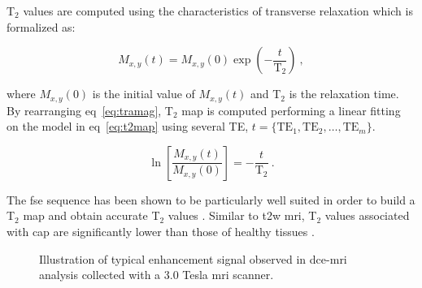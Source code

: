 T$_2$ values are computed using the characteristics of transverse relaxation which is formalized as:

\begin{equation}
	M_{x,y}(t) = M_{x,y}(0) \exp \left( - \frac{t}{\text{T}_2} \right) \ ,
	\label{eq:tramag}
\end{equation}

\noindent where $M_{x,y}(0)$ is the initial value of $M_{x,y}(t)$ and T$_2$ is the relaxation time.
By rearranging \acs{eq}~\ref{eq:tramag}, T$_2$ map is computed performing a linear fitting on the model in \acs{eq}~\ref{eq:t2map} using several TE, $t=\{ \text{TE}_1,\text{TE}_2, \dotsc ,\text{TE}_m \}$.

\begin{equation}
	\ln \left[ \frac{M_{x,y}(t)}{M_{x,y}(0)} \right] = - \frac{t}{\text{T}_2} \ .
	\label{eq:t2map}
\end{equation}

The \Ac{fse} sequence has been shown to be particularly well suited in order to build a T$_2$ map and obtain accurate T$_2$ values \cite{Liney1996a}.
Similar to \ac{t2w} \ac{mri}, T$_2$ values associated with \ac{cap} are significantly lower than those of healthy tissues \cite{Liney1996,Gibbs2001}.

\begin{figure}
\centering
	\hspace*{\fill}
	 \hfill
	\hspace*{\fill}
	\caption[Enhancement of \ac{dce}-\ac{mri} signal.]{Illustration of typical enhancement signal observed in \ac{dce}-\ac{mri} analysis collected with a 3.0 Tesla \ac{mri} scanner.}
	\label{fig:dceana}
\end{figure}

